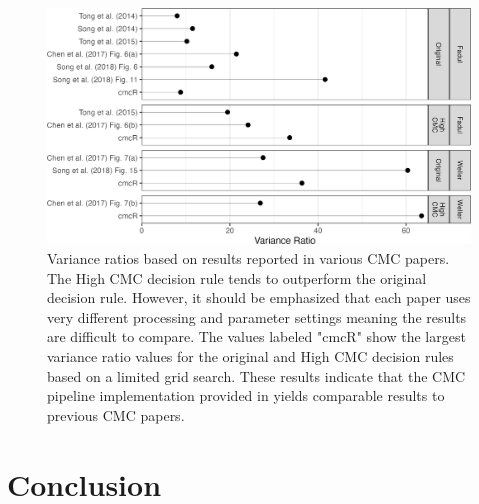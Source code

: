 \begin{figure}[htbp]

{\centering \includegraphics[width=\textwidth]{figures/varianceRatio_paperComparisons} 

}

\caption{Variance ratios based on results reported in various CMC papers. The High CMC decision rule tends to outperform the original decision rule. However, it should be emphasized that each paper uses very different processing and parameter settings meaning the results are difficult to compare. The values labeled "cmcR" show the largest variance ratio values for the original and High CMC decision rules based on a limited grid search. These results indicate that the CMC pipeline implementation provided in  yields comparable results to previous CMC papers.}\label{fig:cmc-varRatioComparison}
\end{figure}

\hypertarget{conclusion}{%
\section{Conclusion}\label{conclusion}}

